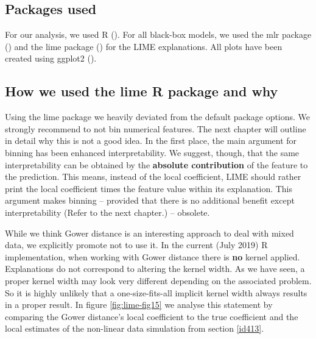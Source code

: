 \documentclass[
]{krantz}
\begin{document}
\hypertarget{id61}{%
\subsection{Packages used}\label{id61}}

For our analysis, we used R (\citet{R-base}).
For all black-box models, we used the mlr package (\citet{R-mlr}) and the lime package (\citet{R-lime}) for the LIME explanations.
All plots have been created using ggplot2 (\citet{R-ggplot2}).

\hypertarget{id62}{%
\subsection{How we used the lime R package and why}\label{id62}}

Using the lime package we heavily deviated from the default package options.
We strongly recommend to not bin numerical features.
The next chapter will outline in detail why this is not a good idea.
In the first place, the main argument for binning has been enhanced interpretability.
We suggest, though, that the same interpretability can be obtained by the \textbf{absolute contribution} of the feature to the prediction.
This means, instead of the local coefficient, LIME should rather print the local coefficient times the feature value within its explanation.
This argument makes binning -- provided that there is no additional benefit except interpretability (Refer to the next chapter.) -- obsolete.

While we think Gower distance is an interesting approach to deal with mixed data, we explicitly promote not to use it.
In the current (July 2019) R implementation, when working with Gower distance there is \textbf{no} kernel applied.
Explanations do not correspond to altering the kernel width.
As we have seen, a proper kernel width may look very different depending on the associated problem.
So it is highly unlikely that a one-size-fits-all implicit kernel width always results in a proper result.
In figure \ref{fig:lime-fig15} we analyse this statement by comparing the Gower distance's local coefficient to the true coefficient and the local estimates of the non-linear data simulation from section \ref{id413}.
\end{document}
